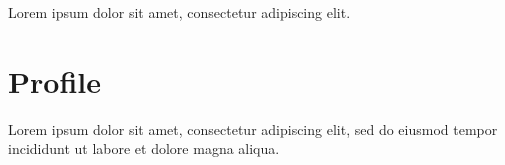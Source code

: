 \documentclass{vitae}
\begin{document}
\begin{masthead}
  Lorem ipsum dolor sit amet, consectetur adipiscing elit.
\end{masthead}

\section{Profile}
Lorem ipsum dolor sit amet, consectetur adipiscing elit, sed do eiusmod
tempor incididunt ut labore et dolore magna aliqua.

\end{document}
